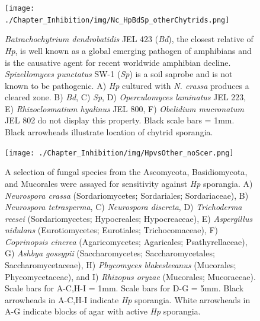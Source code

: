 \begin{figure}[hb]
  \centering
  \texttt{[image: ./Chapter\_Inhibition/img/Nc\_HpBdSp\_otherChytrids.png]}
  \caption[Inhibition of \textit{N. crassa} is observed with \textit{H. polyrhiza} and not other chytrids.]{\textit{Batrachochytrium dendrobatidis} JEL 423 (\textit{Bd}), the closest relative of \textit{Hp}, is well known as a global emerging pathogen of amphibians and is the causative agent for recent worldwide amphibian decline. \textit{Spizellomyces punctatus} SW-1 (\textit{Sp}) is a soil saprobe and is not known to be pathogenic. A) \textit{Hp} cultured with \textit{N. crassa} produces a cleared zone. B) \textit{Bd}, C) \textit{Sp}, D) \textit{Operculomyces laminatus} JEL 223, E) \textit{Rhizoclosmatium hyalinus} JEL 800, F) \textit{Obelidium mucronatum} JEL 802 do not display this property. Black scale bars = 1mm. Black arrowheads illustrate location of chytrid sporangia.}
  \label{fig:ChInhib_NcraChytrids}
\end{figure}

\begin{figure}[hb]
  \centering
  \texttt{[image: ./Chapter\_Inhibition/img/HpvsOther\_noScer.png]}
  \caption[Inhibitory properties of \textit{H. polyrhiza} are not specific to \textit{N. crassa}.]{A selection of fungal species from the Ascomycota, Basidiomycota, and Mucorales were assayed for sensitivity against \textit{Hp} sporangia. A) \textit{Neurospora crassa} (Sordariomycetes; Sordariales; Sordariaceae), B) \textit{Neurospora tetrasperma}, C) \textit{Neurospora discreta}, D) \textit{Trichoderma reesei} (Sordariomycetes; Hypocreales; Hypocreaceae), E) \textit{Aspergillus nidulans} (Eurotiomycetes; Eurotiales; Trichocomaceae), F) \textit{Coprinopsis cinerea} (Agaricomycetes; Agaricales; Psathyrellaceae), G) \textit{Ashbya gossypii} (Saccharomycetes; Saccharomycetales; Saccharomycetaceae), H) \textit{Phycomyces blakesleeanus} (Mucorales; Phycomycetaceae), and I) \textit{Rhizopus oryzae} (Mucorales; Mucoraceae). Scale bars for A-C,H-I = 1mm. Scale bars for D-G = 5mm. Black arrowheads in A-C,H-I indicate \textit{Hp} sporangia. White arrowheads in A-G indicate blocks of agar with active \textit{Hp} sporangia.}
  \label{fig:ChInhib_HpOtherFungi}
\end{figure}

